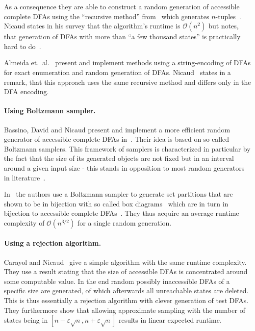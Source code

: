 As a consequence they are able to construct a random generation of accessible complete DFAs using the ``recursive method'' from~\cite{NW78} which generates $n$-tuples~\cite[p. 10]{CP05}. Nicaud states in his survey that the algorithm's runtime is $\mathcal{O}(n^2)$ but notes, that generation of DFAs with more than ``a few thousand states'' is practically hard to do~\cite[pp. 10-11]{Nic14}.

Almeida et.\ al.~\cite{AAA09, AMR09, RMA05} present and implement methods using a string-encoding of DFAs for exact enumeration and random generation of DFAs. Nicaud~\cite[p. 11]{Nic14} states in a remark, that this approach uses the same recursive method and differs only in the DFA encoding.

\paragraph*{Using Boltzmann sampler.}

Bassino, David and Nicaud present and implement a more efficient random generator of accessible complete DFAs in~\cite{BDN07, BN07}. Their idea is based on so called Boltzmann samplers. This framework of samplers is characterized in particular by the fact that the size of its generated objects are not fixed but in an interval around a given input size - this stands in opposition to most random generators in literature~\cite[p. 2]{DFL04}.

In~\cite{BN07} the authors use a Boltzmann sampler to generate set partitions that are shown to be in bijection with so called box diagrams~\cite[p. 8]{BN07} which are in turn in bijection to accessible complete DFAs~\cite[p. 4]{BN07}. They thus acquire an average runtime complexity of $\mathcal{O}(n^{3/2})$ for a single random generation.

\paragraph*{Using a rejection algorithm.}

Carayol and Nicaud~\cite{CN12} give a simple algorithm with the same runtime complexity. They use a result stating that the size of accessible DFAs is concentrated around some computable value. In the end random possibly inaccessible DFAs of a specific size are generated, of which afterwards all unreachable states are deleted. This is thus essentially a rejection algorithm with clever generation of test DFAs. They furthermore show that allowing approximate sampling with the number of states being in $[n-\varepsilon\sqrt{n}, n+\varepsilon\sqrt{n}]$ results in linear expected runtime.


